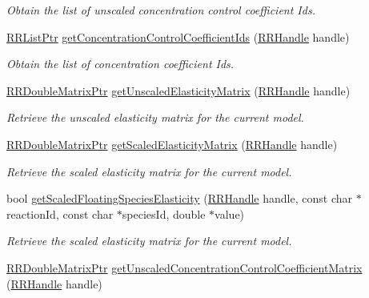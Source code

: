 \begin{DoxyCompactItemize}
\begin{DoxyCompactList}\small\item\em Obtain the list of unscaled concentration control coefficient Ids. \end{DoxyCompactList}\item 
\hyperlink{rrc__types_8h_a32a8a60ac06858ff3a791672bd2bec73}{R\-R\-List\-Ptr} \hyperlink{group__mca_ga650eb79cd39ede099c416607706b9608}{get\-Concentration\-Control\-Coefficient\-Ids} (\hyperlink{rrc__types_8h_a1d68f0592372208fa5a5f2799ea4b3ae}{R\-R\-Handle} handle)
\begin{DoxyCompactList}\small\item\em Obtain the list of concentration coefficient Ids. \end{DoxyCompactList}\item 
\hyperlink{rrc__types_8h_ae586a879d30f0823087e42d93464b5dd}{R\-R\-Double\-Matrix\-Ptr} \hyperlink{group__mca_ga14c1f732f8988b2956f096de2fe284f6}{get\-Unscaled\-Elasticity\-Matrix} (\hyperlink{rrc__types_8h_a1d68f0592372208fa5a5f2799ea4b3ae}{R\-R\-Handle} handle)
\begin{DoxyCompactList}\small\item\em Retrieve the unscaled elasticity matrix for the current model. \end{DoxyCompactList}\item 
\hyperlink{rrc__types_8h_ae586a879d30f0823087e42d93464b5dd}{R\-R\-Double\-Matrix\-Ptr} \hyperlink{group__mca_ga4f2788a77a8c7549cb8e45b1c5a89bc7}{get\-Scaled\-Elasticity\-Matrix} (\hyperlink{rrc__types_8h_a1d68f0592372208fa5a5f2799ea4b3ae}{R\-R\-Handle} handle)
\begin{DoxyCompactList}\small\item\em Retrieve the scaled elasticity matrix for the current model. \end{DoxyCompactList}\item 
bool \hyperlink{group__mca_ga2bb4853eff9e824836b776cf67ba63b0}{get\-Scaled\-Floating\-Species\-Elasticity} (\hyperlink{rrc__types_8h_a1d68f0592372208fa5a5f2799ea4b3ae}{R\-R\-Handle} handle, const char $\ast$reaction\-Id, const char $\ast$species\-Id, double $\ast$value)
\begin{DoxyCompactList}\small\item\em Retrieve the scaled elasticity matrix for the current model. \end{DoxyCompactList}\item 
\hyperlink{rrc__types_8h_ae586a879d30f0823087e42d93464b5dd}{R\-R\-Double\-Matrix\-Ptr} \hyperlink{group__mca_gacb5aba2a12248da9b2d55624687a7ace}{get\-Unscaled\-Concentration\-Control\-Coefficient\-Matrix} (\hyperlink{rrc__types_8h_a1d68f0592372208fa5a5f2799ea4b3ae}{R\-R\-Handle} handle)

\end{DoxyCompactItemize}
